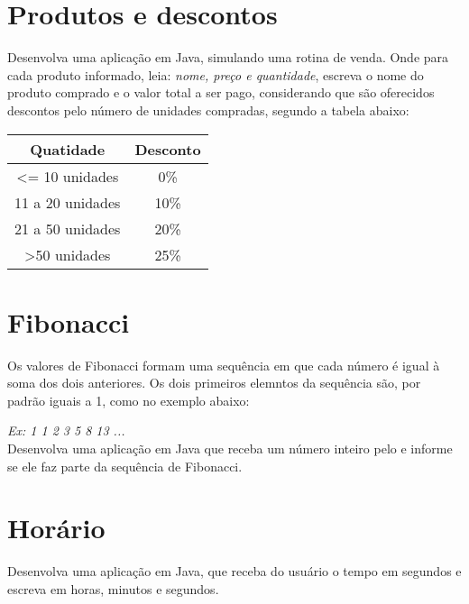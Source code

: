 \documentclass[12pt,a4paper, brazil]{article}
\begin{document}
\section{Produtos e descontos}
\par
Desenvolva uma aplicação em Java, simulando uma rotina de venda. Onde para cada produto informado, leia: \textit{nome, preço e quantidade}, escreva o nome do produto comprado e o valor total a ser pago, considerando que são oferecidos descontos pelo número de unidades compradas, segundo a tabela abaixo:	\\
\begin{center}
\begin{table}[!ht]
\begin{tabular}{|c|c|}
 \hline
\textbf{Quatidade} & \textbf{Desconto} \\  \hline
\textless{}= 10 unidades & 0\% \\  \hline
11 a 20 unidades & 10\% \\  \hline
21 a 50 unidades & 20\% \\  \hline
\textgreater 50 unidades & 25\% \\  \hline
\end{tabular}
\end{table}
\end{center} 

 \dotfill

 \section{Fibonacci}

Os valores de Fibonacci formam uma sequência em que cada número é igual à soma dos dois anteriores. Os dois primeiros elemntos da sequência são, por padrão iguais a 1, como no exemplo abaixo:


\textit{Ex: 1 1 2 3 5 8 13 ...}\\


Desenvolva uma aplicação em Java que receba um número inteiro pelo e informe se ele faz parte da sequência de Fibonacci. 

 \dotfill
 
\section{Horário}
\par
Desenvolva uma aplicação em Java, que receba do usuário o tempo em segundos e escreva em horas, minutos e segundos. 

 \dotfill
\end{document}
